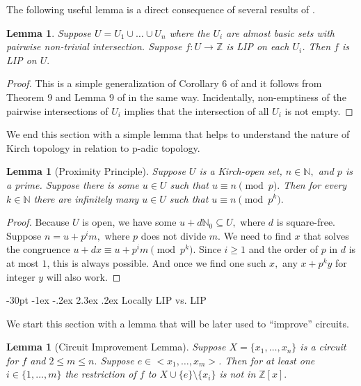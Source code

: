 \documentclass[10pt]{article}
\makeatletter
\renewcommand\section{\@startsection {section}{1}{\z@}
{-30pt \@plus -1ex \@minus -.2ex}
{2.3ex \@plus.2ex}
{\normalfont\normalsize\bfseries\boldmath}}
\newtheorem{lemma}[theorem]{Lemma}
\theoremstyle{definition}
\makeatother
\begin{document}
The following useful lemma is a direct consequence of several results of \cite{LIP}.

\begin{lemma} \label{Lstar} Suppose $U=U_1\cup \ldots \cup U_n$ where the $U_i$ are almost basic sets with pairwise non-trivial intersection. Suppose $f:U \to \mathbb Z$ is LIP on each $U_i$. Then $f$ is LIP on $U.$
\end{lemma}

\begin{proof} This is a simple generalization of Corollary 6 of \cite{LIP} and it follows from Theorem 9 and Lemma 9 of \cite{LIP} in the same way. Incidentally, non-emptiness of the pairwise intersections of $U_i$ implies that the intersection of all $U_i$ is not empty.
\end{proof}

We end this section with a simple lemma that helps to understand the nature of Kirch topology in relation to p-adic topology.

\begin{lemma}[Proximity Principle] \label{PP} Suppose $U$ is a Kirch-open set, $n\in \mathbb N,$ and $p$ is a prime. Suppose there is some $u\in U$ such that $u \equiv n \pmod p.$ Then for every $k\in \mathbb N$ there are infinitely many $u \in U$ such that $u \equiv n \pmod{p^k}.$
\end{lemma}

\begin{proof} Because $U$ is open, we have some $u+d\mathbb N_0\subseteq U,$ where $d$ is square-free. Suppose $n=u+p^i m,$ where $p$ does not divide $m.$ We need to find $x$ that solves the congruence $u + dx \equiv u+p^i m \pmod{p^k}.$ Since $i\geq 1$ and the order of $p$ in $d$ is at most $1$, this is always possible. And once we find one such $x,$ any $x+p^ky$ for integer $y$ will also work.
\end{proof}



\section{Locally LIP vs. LIP }%

We start  this section with a lemma that will be later used to ``improve'' circuits.
 
\begin{lemma}[Circuit Improvement Lemma] \label{CircuitImprovement}Suppose $X=\{x_1,\dots,x_n\}$ is a circuit for $f$ and $2\leq m\leq n.$ Suppose $e \in  <x_1,\dots , x_m>$. Then for at least one $i\in \{1,\dots, m\}$ the restriction of $f$ to $X\cup \{e\} \setminus\{x_i\}$ is not in $\mathbb Z [x].$
\end{lemma}
\end{document}
